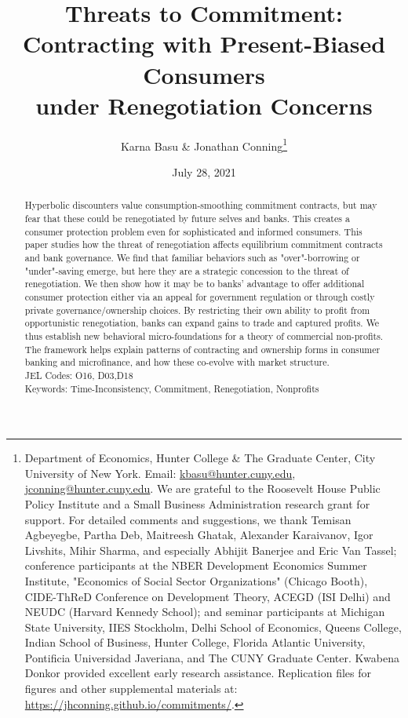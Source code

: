 \documentclass[11pt,english]{article}
\date{July 28, 2021}\usepackage{babel}
\theoremstyle{plain}
\theoremstyle{definition}
\begin{document}

\title{Threats to Commitment:\\Contracting with Present-Biased Consumers\\under Renegotiation Concerns}

\author{Karna Basu \& Jonathan Conning\thanks{Department of Economics, Hunter College \& The Graduate Center, City
University of New York. Email: \href{mailto:kbasu@hunter.cuny.edu}{kbasu@hunter.cuny.edu}, \href{mailto:jconning@hunter.cuny.edu}{jconning@hunter.cuny.edu}.
We are grateful to the Roosevelt House Public Policy Institute and
a Small Business Administration research grant for support. For detailed
comments and suggestions, we thank Temisan Agbeyegbe, Partha Deb, Maitreesh Ghatak, Alexander Karaivanov, Igor Livshits, Mihir Sharma, and especially Abhijit Banerjee and Eric Van Tassel; conference participants at the NBER Development
Economics Summer Institute, "Economics of Social Sector Organizations"
(Chicago Booth), CIDE-ThReD Conference on Development Theory, ACEGD
(ISI Delhi) and NEUDC (Harvard Kennedy School); and seminar participants
at Michigan State University, IIES Stockholm, Delhi School of Economics,
Queens College, Indian School of Business, Hunter College, Florida
Atlantic University, Pontificia Universidad Javeriana, and The CUNY Graduate
Center. Kwabena Donkor provided excellent early research assistance.
Replication files for figures and other supplemental materials at:
\protect\url{https://jhconning.github.io/commitments/}.}}




\maketitle

\begin{abstract}
Hyperbolic discounters value consumption-smoothing commitment contracts, but may fear that these could be renegotiated by future selves and banks. This creates a consumer protection problem even for sophisticated and informed consumers. This paper studies how the threat of renegotiation affects equilibrium commitment contracts and bank governance. We find that familiar behaviors such as "over"-borrowing or "under"-saving emerge, but here they are a strategic concession to the threat of renegotiation. We then show how it may be to banks' advantage to offer additional consumer protection either via an appeal for government regulation or through costly private governance/ownership choices. By restricting their own ability to profit from opportunistic renegotiation, banks can expand gains to trade and captured profits. We thus establish new behavioral micro-foundations for a theory of commercial non-profits. The framework helps explain patterns of contracting and ownership forms in consumer banking and microfinance, and how these co-evolve with market structure.   
\\JEL Codes: O16, D03,D18 
\\Keywords: Time-Inconsistency, Commitment, Renegotiation, Nonprofits
\end{abstract}
\vspace{\baselineskip}
\end{document}
